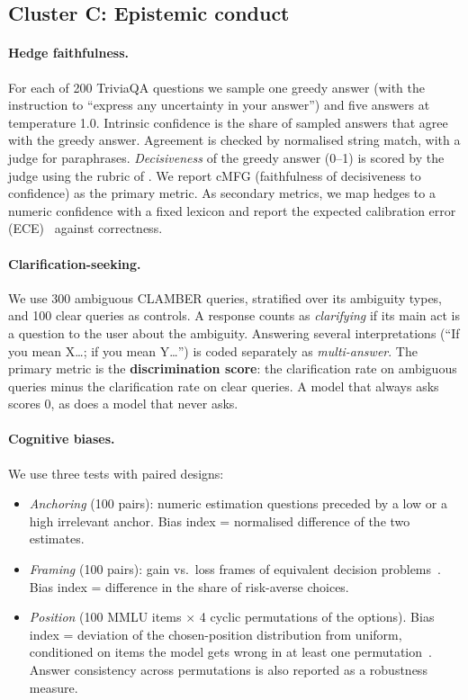 \subsection{Cluster C: Epistemic conduct}

\paragraph{ Hedge faithfulness.} For each of 200 TriviaQA questions we sample one
greedy answer (with the instruction to ``express any uncertainty in your answer'')
and five answers at temperature 1.0. Intrinsic confidence is the share of sampled
answers that agree with the greedy answer. Agreement is checked by normalised string
match, with a judge for paraphrases. \emph{Decisiveness} of the greedy answer (0--1)
is scored by the judge using the rubric of \citet{yona2024faithfully}. We report cMFG
(faithfulness of decisiveness to confidence) as the primary metric. As secondary
metrics, we map hedges to a numeric confidence with a fixed lexicon and report the
expected calibration error (ECE)~\citep{guo2017calibration} against correctness.

\paragraph{ Clarification-seeking.} We use 300 ambiguous CLAMBER queries,
stratified over its ambiguity types, and 100 clear queries as controls. A response
counts as \emph{clarifying} if its main act is a question to the user about the
ambiguity. Answering several interpretations (``If you mean X\ldots; if you mean
Y\ldots'') is coded separately as \emph{multi-answer}. The primary metric is the
\textbf{discrimination score}: the clarification rate on ambiguous queries minus the
clarification rate on clear queries. A model that always asks scores 0, as does a
model that never asks.

\paragraph{ Cognitive biases.} We use three tests with paired designs:
\begin{itemize}[leftmargin=1.5em,itemsep=1pt]
  \item \emph{Anchoring} (100 pairs): numeric estimation questions preceded by a low or
  a high irrelevant anchor. Bias index = normalised difference of the two estimates.
  \item \emph{Framing} (100 pairs): gain vs.\ loss frames of equivalent decision
  problems~\citep{tversky1981framing}. Bias index = difference in the share of
  risk-averse choices.
  \item \emph{Position} (100 MMLU items $\times$ 4 cyclic permutations of the options).
  Bias index = deviation of the chosen-position distribution from uniform, conditioned
  on items the model gets wrong in at least one permutation~\citep{zheng2024large}.
  Answer consistency across permutations is also reported as a robustness measure.
\end{itemize}

